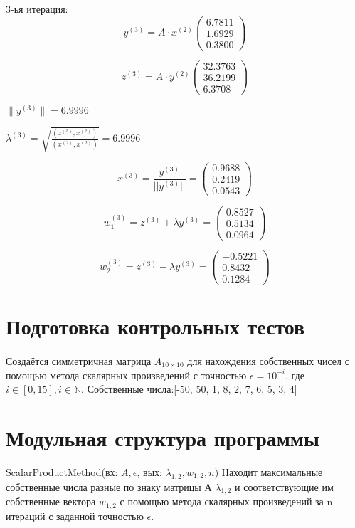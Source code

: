 \documentclass{article}
\begin{document}
	3-ья итерация:
	\[y^{(3)} = A \cdot x^{(2)}							
\left(
\begin{array}{ccc}
	6.7811 \\
	1.6929 \\
	0.3800
\end{array}
\right) \] 

\[z^{(3)} = A \cdot y^{(2)}							
\left(
\begin{array}{ccc}
	32.3763 \\
	36.2199 \\
	6.3708
\end{array}
\right) \] 

$\|y^{(3)}\| = 6.9996$


$\lambda^{(3)} = \sqrt{\frac{(z^{(3)}, x^{(2)})}	{(x^{(2)}, x^{(2)})}} =  6.9996$


\[x^{(3)} = \frac{y^{(3)}}{||y^{(3)}||}= 							
\left(
\begin{array}{ccc}
	0.9688  \\
	0.2419  \\
	0.0543
\end{array}
\right) \] 

\[w^{(3)}_1 =z^{(3)} +  \lambda y^{(3)}=							
\left(
\begin{array}{ccc}
	0.8527 \\
	0.5134 \\
	0.0964
\end{array}
\right) \]

\[w^{(3)}_2 =z^{(3)} - \lambda y^{(3)}=							
\left(
\begin{array}{ccc}
	-0.5221 \\
	0.8432 \\
	0.1284 
\end{array}
\right) \]

	
	\section{Подготовка контрольных тестов}
	\paragraph{}Создаётся симметричная матрица  $A_{10 \times 10}$  для нахождения собственных чисел с помощью метода скалярных произведений с точностью  $\epsilon=10^{-i}$, где $i \in [0, 15], i \in \mathbb {N} $. 
	Собственные числа:[-50, 50, 1, 8, 2, 7, 6, 5, 3, 4]
	
	\section{Модульная структура программы}
	ScalarProductMethod(вх: $A, \epsilon$, вых: $\lambda_{1,2}, w_{1,2}, n$) Находит  максимальные собственные числа разные по знаку матрицы А  $\lambda_{1,2}$ и соответствующие им собственные вектора $w_{1,2}$ с помощью метода скалярных произведений за n итераций с заданной точностью $\epsilon$.
\end{document}
